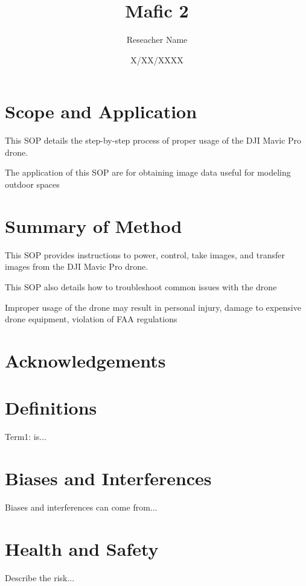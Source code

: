 \documentclass[12pt]{../SOP4_alpha}\usepackage[]{graphicx}\usepackage[]{color}
\title{Mafic 2}
\date{X/XX/XXXX}
\author{Reseacher Name}
\begin{document}
\maketitle

\section{Scope and Application}

\NP This SOP details the step-by-step process of proper usage of the DJI Mavic Pro drone.

\NP The application of this SOP are for obtaining image data useful for modeling outdoor spaces

\section{Summary of Method}

\NP This SOP provides instructions to power, control, take images, and transfer images from the DJI Mavic Pro drone.

\NP This SOP also details how to troubleshoot common issues with the drone

\NP Improper usage of the drone may result in personal injury, damage to expensive drone equipment, violation of FAA regulations

\tableofcontents

\newpage

\section{Acknowledgements}

\section{Definitions}

\NP Term1: is...

\section{Biases and Interferences}

\NP Biases and interferences can come from...

\section{Health and Safety}

\NP Describe the risk...
\end{document}
